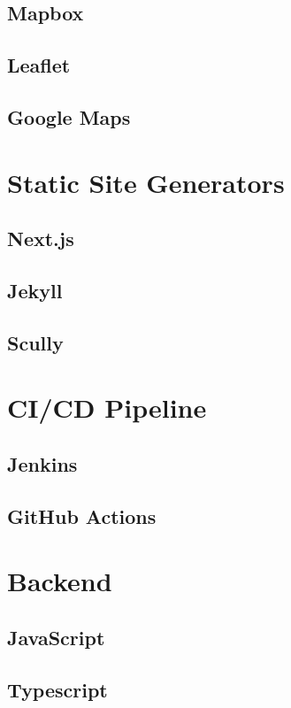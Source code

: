 \subsection{Mapbox}
\subsection{Leaflet}
\subsection{Google Maps}

\section{Static Site Generators}
\subsection{Next.js}
\subsection{Jekyll}
\subsection{Scully}

\section{CI/CD Pipeline}
\subsection{Jenkins}
\subsection{GitHub Actions}

\section{Backend}
\subsection{JavaScript}
\subsection{Typescript}

